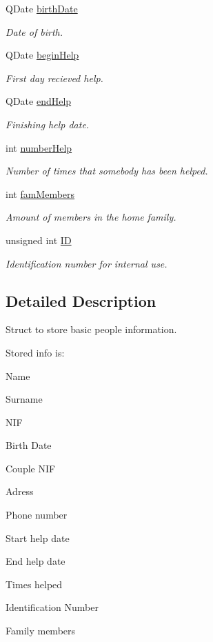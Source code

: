 \begin{DoxyCompactItemize}
Q\+Date \hyperlink{struct_person_1_1info_a803a2ee586aaa2503e10447b1435e916}{birth\+Date}
\begin{DoxyCompactList}\small\item\em Date of birth. \end{DoxyCompactList}\item 
Q\+Date \hyperlink{struct_person_1_1info_a835c907e641433331e06c62bcde9dfe9}{begin\+Help}
\begin{DoxyCompactList}\small\item\em First day recieved help. \end{DoxyCompactList}\item 
Q\+Date \hyperlink{struct_person_1_1info_acc738154c5e01adc22c880fc49d6e09c}{end\+Help}
\begin{DoxyCompactList}\small\item\em Finishing help date. \end{DoxyCompactList}\item 
int \hyperlink{struct_person_1_1info_a6fd0e334bf6cc9baf667ef94806ed993}{number\+Help}
\begin{DoxyCompactList}\small\item\em Number of times that somebody has been helped. \end{DoxyCompactList}\item 
int \hyperlink{struct_person_1_1info_afc121f83e810c2c0318e115f4ba6d730}{fam\+Members}
\begin{DoxyCompactList}\small\item\em Amount of members in the home family. \end{DoxyCompactList}\item 
unsigned int \hyperlink{struct_person_1_1info_a535ca27747d371eb58005194190f6bd6}{I\+D}
\begin{DoxyCompactList}\small\item\em Identification number for internal use. \end{DoxyCompactList}\end{DoxyCompactItemize}


\subsection{Detailed Description}
Struct to store basic people information. 

Stored info is\+: 
\begin{DoxyItemize}
\item Name 
\item Surname 
\item N\+I\+F 
\item Birth Date 
\item Couple N\+I\+F 
\item Adress 
\item Phone number 
\item Start help date 
\item End help date 
\item Times helped 
\item Identification Number 
\item Family members 
\end{DoxyItemize}

